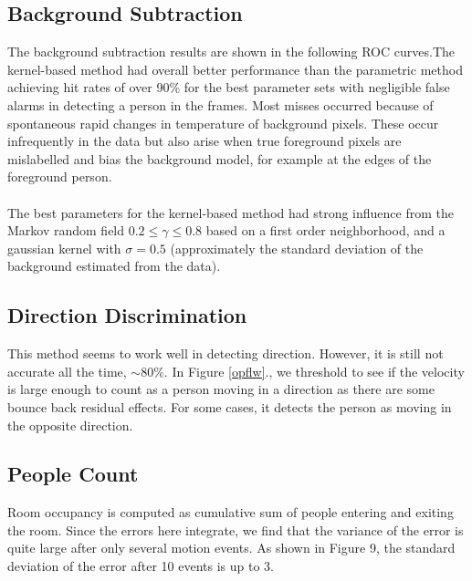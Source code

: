\documentclass[12pt,oneside]{article} %
\begin{document}
\subsection{Background Subtraction}  %
The background subtraction results are shown in the following ROC curves.The kernel-based method
had overall better performance than the parametric method achieving hit rates of over 90\% for the best
parameter sets with negligible false alarms in detecting a person in the frames. Most misses occurred
because of spontaneous rapid changes in temperature of background pixels. These occur infrequently
in the data but also arise when true foreground pixels are mislabelled and bias the background model, for 
example at the edges of the foreground person.
\\ \\
The best parameters for the kernel-based method had strong influence from the Markov random field
$0.2 \le \gamma \le 0.8$ based on a first order neighborhood, 
and a gaussian kernel with $\sigma = 0.5$ (approximately the standard deviation of 
the background estimated from the data).

\subsection{Direction Discrimination}  %
This method seems to work well in detecting direction. However, it is still not accurate all the time, $\sim80\%$.
In Figure \ref{opflw}., we threshold to see if the velocity is large enough to count as a person moving in a direction
as there are some bounce back residual effects. For some 
cases, it detects the person as moving in the opposite direction. 

\subsection{People Count}
Room occupancy is computed as cumulative sum of people entering and exiting the room. Since the errors here
integrate, we find that the variance of the error is quite large after only several motion events. As shown in Figure 9,
the standard deviation of the error after 10 events is up to 3.
\end{document}
